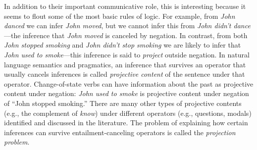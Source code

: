 \documentclass[10pt,letterpaper]{article}
\begin{document}
In addition to their important communicative role, this  is interesting because it seems to flout some of the most basic rules of logic. For example, from \emph{John danced} we can infer \emph{John moved}, but we cannot infer this from \emph{John didn't dance}---the inference that \emph{John moved} is canceled by negation.
In contrast, from both \emph{John stopped smoking} and \emph{John didn't stop smoking} we are likely to infer that \emph{John used to smoke}---this inference is said to \emph{project} outside negation.
In natural language semantics and pragmatics, an inference that survives an operator that usually cancels inferences is called
 \emph{projective content} of the sentence under that operator. 
Change-of-state verbs can have information about the past as projective content under negation: \emph{John used to smoke} is projective content under negation of ``John stopped smoking.'' 
There are many other types of projective contents 
 (e.g., the complement of \emph{know}) under different operators 
 (e.g., questions, modals) identified and discussed in the literature. 
The problem of explaining how certain inferences can
 survive entailment-canceling operators is called the \emph{projection problem}.



\end{document}
